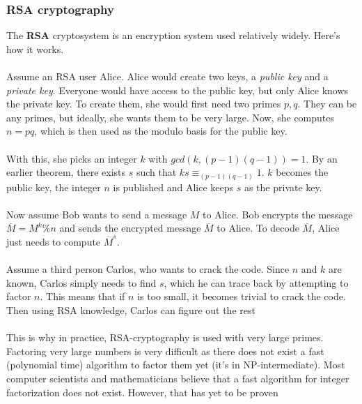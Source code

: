 \documentclass{article}
\begin{document}
\subsubsection{RSA cryptography}
The \textbf{RSA} cryptosystem is an encryption system used relatively widely. Here's how it works.
\\\\
Assume an RSA user Alice. Alice would create two keys, a \textit{public key} and a \textit{private key}. Everyone would have access to the public key, but only Alice knows the private key. To create them, she would first need two primes $p,q$. They can be any primes, but ideally, she wants them to be very large. Now, she computes $n = pq$, which is then used as the modulo basis for the public key.
\\\\
With this, she picks an integer $k$ with $gcd(k,(p-1)(q-1))=1$. By an earlier theorem, there exists $s$ such that $ks\equiv_{(p-1)(q-1)}1$. $k$ becomes the public key, the integer $n$ is published and Alice keeps $s$ as the private key.
\\\\
Now assume Bob wants to send a message $M$ to Alice. Bob encrypts the message $\overline M = M ^k \% n$ and sends the encrypted message $\overline M$ to Alice. To decode $\overline M $, Alice just needs to compute $\overline M^s$.
\\\\
Assume a third person Carlos, who wants to crack the code. Since $n$ and $k$ are known, Carlos simply needs to find $s$, which he can trace back by attempting to factor $n$. This means that if $n$ is too small, it becomes trivial to crack the code. Then using RSA knowledge, Carlos can figure out the rest
\\\\
This is why in practice, RSA-cryptography is used with very large primes. Factoring very large numbers is very difficult as there does not exist a fast (polynomial time) algorithm to factor them yet (it's in NP-intermediate). Most computer scientists and mathematicians believe that a fast algorithm for integer factorization does not exist. However, that has yet to be proven
\end{document}

